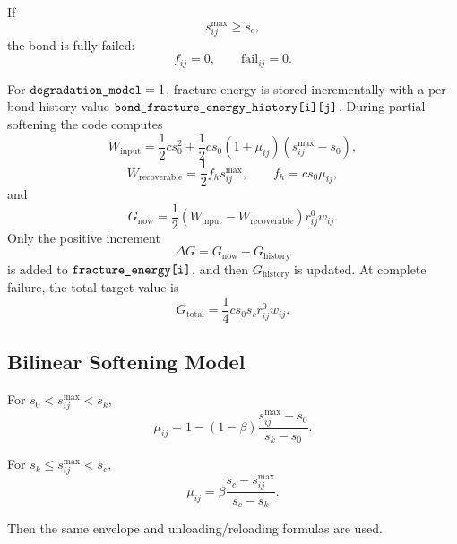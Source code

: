 \documentclass[11pt]{article}
\newcommand{\code}[1]{\texttt{\detokenize{#1}}}
\begin{document}
If
\begin{equation}
    s_{ij}^{\max}\ge s_c,
\end{equation}
the bond is fully failed:
\begin{equation}
    f_{ij}=0,
    \qquad
    \mathrm{fail}_{ij}=0 .
\end{equation}

For \(\code{degradation_model}=1\), fracture energy is stored incrementally with
a per-bond history value \(\code{bond_fracture_energy_history[i][j]}\). During
partial softening the code computes
\begin{equation}
    W_{\mathrm{input}}
    =
    \frac12 c s_0^2
    +
    \frac12 c s_0(1+\mu_{ij})(s_{ij}^{\max}-s_0),
\end{equation}
\begin{equation}
    W_{\mathrm{recoverable}}
    =
    \frac12 f_hs_{ij}^{\max},
    \qquad
    f_h=cs_0\mu_{ij},
\end{equation}
and
\begin{equation}
    G_{\mathrm{now}}
    =
    \frac12
    \left(
        W_{\mathrm{input}}-W_{\mathrm{recoverable}}
    \right)
    r_{ij}^0w_{ij}.
\end{equation}
Only the positive increment
\begin{equation}
    \Delta G
    =
    G_{\mathrm{now}}-G_{\mathrm{history}}
\end{equation}
is added to \(\code{fracture_energy[i]}\), and then \(G_{\mathrm{history}}\) is
updated. At complete failure, the total target value is
\begin{equation}
    G_{\mathrm{total}}
    =
    \frac14 c s_0s_c r_{ij}^0w_{ij}.
\end{equation}

\subsection{Bilinear Softening Model}

For \(s_0<s_{ij}^{\max}<s_k\),
\begin{equation}
    \mu_{ij}
    =
    1
    -
    (1-\beta)
    \frac{s_{ij}^{\max}-s_0}{s_k-s_0}.
\end{equation}

For \(s_k\le s_{ij}^{\max}<s_c\),
\begin{equation}
    \mu_{ij}
    =
    \beta
    \frac{s_c-s_{ij}^{\max}}{s_c-s_k}.
\end{equation}

Then the same envelope and unloading/reloading formulas are used.
\end{document}
